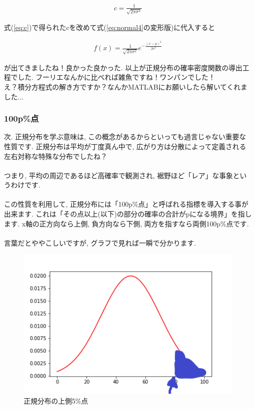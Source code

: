 \documentclass[11pt,a4paper]{jsarticle}                    %
\begin{document}
\begin{eqnarray}
\label{eq:c}
c = \frac{1}{\sqrt{2\pi\sigma^2}}
\end{eqnarray}

式(\ref{eq:c})で得られたcを改めて式(\ref{eq:normal4}の変形版)に代入すると

\begin{eqnarray}
f(x) = \frac{1}{\sqrt{2\pi\sigma^2}}e^{-\frac{(x-\mu)^2}{2\sigma^2}}
\end{eqnarray}

が出てきましたね！良かった良かった. 以上が正規分布の確率密度関数の導出工程でした. フーリエなんかに比べれば雑魚ですね！ワンパンでした！\\
え？積分方程式の解き方ですか？なんかMATLABにお願いしたら解いてくれました...

\subsubsection{100p\%点}
次. 正規分布を学ぶ意味は, この概念があるからといっても過言じゃない重要な性質です. 正規分布は平均が丁度真ん中で, 広がり方は分散によって定義される左右対称な特殊な分布でしたね？\\\\
つまり, 平均の周辺であるほど高確率で観測され, 裾野ほど「レア」な事象というわけです.\\\\
この性質を利用して, 正規分布には「100p\%点」と呼ばれる指標を導入する事が出来ます. これは「その点以上(以下)の部分の確率の合計がpになる境界」を指します. x軸の正方向なら上側, 負方向なら下側, 両方を指すなら両側100p\%点です. \\\\
言葉だとややこしいですが, グラフで見れば一瞬で分かります.


\begin{figure}[H]
\label{im:upper}
  \centering
  \includegraphics[width=120mm,bb=0 0 432 288]{../figures/upper_p.png}
  \caption{正規分布の上側5\%点}
\end{figure}
\end{document}
